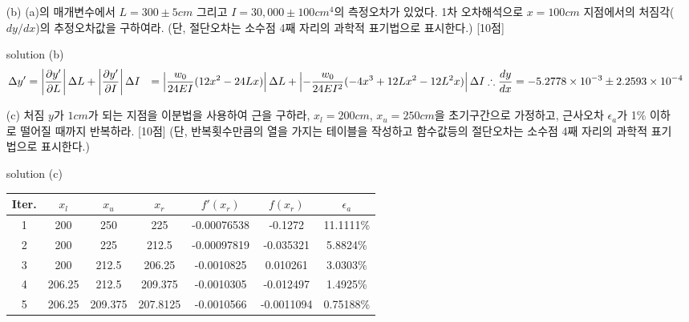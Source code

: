 \documentclass[a4,10pt]{article}
\numberwithin{algorithm}{section}
\theoremstyle{examplestyle}
\let\\\tabularnewline
\let\\\tabularnewline
\begin{document}
\begin{itemize}
\item[(b)] (a)의 매개변수에서 $L=300\pm5cm$ 그리고 $I=30,000\pm100cm^4$의 측정오차가 있었다. 1차 오차해석으로 $x=100cm$ 지점에서의 처짐각($dy/dx$)의 추정오차값을 구하여라. (단, 절단오차는 소수점 4째 자리의 과학적 표기법으로 표시한다.) [10점]
\item[solution (b)]
\begin{align*}
\Delta y'&=\left|\frac{\partial y'}{\partial L}\right|\Delta L+\left|\frac{\partial y'}{\partial I}\right|\Delta I\\
&=\left|\frac{w_{0}}{24EI}(12x^2-24Lx)\right|\Delta L + \left|-\frac{w_{0}}{24EI^2}(-4x^3+12Lx^2-12L^2 x)\right|\Delta I\\
\therefore \frac{dy}{dx}&=-5.2778 \times 10^{-3} \pm 2.2593 \times 10^{-4}
\end{align*}
\item[(c)] 처짐 $y$가 $1cm$가 되는 지점을 이분법을 사용하여 근을 구하라, $x_{l}=200cm$, $x_{u}=250cm$을 초기구간으로 가정하고, 근사오차 $\epsilon_{a}$가 1\% 이하로 떨어질 때까지 반복하라. [10점] (단, 반복횟수만큼의 열을 가지는 테이블을 작성하고 함수값등의 절단오차는 소수점 4째 자리의 과학적 표기법으로 표시한다.)
\item[solution (c)]
\begin{table}[!hbpt]
\centering
\begin{tabular}{c|c|c|c|c|c|c}
\hline\hline
Iter.&$x_l$&$x_u$&$x_r$&$f'(x_r)$&$f(x_r)$&$\epsilon_{a}$\\
\hline
1&200&250&225&-0.00076538&-0.1272&11.1111\%\\
2&200&225&212.5&-0.00097819&-0.035321&5.8824\%\\
3&200&212.5&206.25&-0.0010825&0.010261&3.0303\%\\
4&206.25&212.5&209.375&-0.0010305&-0.012497&1.4925\%\\
5&206.25&209.375&207.8125&-0.0010566&-0.0011094&0.75188\%\\
\hline\hline
\end{tabular}
\end{table}

\end{itemize}
\end{document}
